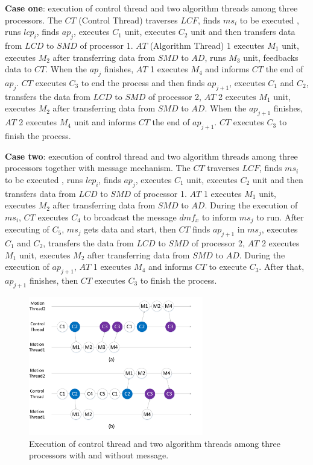 \documentclass[journal,UTF8]{IEEEtran}
\begin{document}
  \textbf{Case one}: execution of control thread and two algorithm threads among three processors. The $CT$ (Control Thread) traverses $LCF$, finds $ms_i$ to be executed , runs $lcp_i$, finds $ap_j$, executes $C_1$ unit, executes $C_2$ unit and then transfers data from $LCD$ to $SMD$ of processor 1. $AT$ (Algorithm Thread) 1 executes $M_1$ unit, executes $M_2$ after transferring data from $SMD$ to $AD$, runs $M_3$ unit, feedbacks data to $CT$. When the $ap_j$ finishes, $AT$ 1 executes $M_4$ and informs $CT$ the end of $ap_j$. $CT$ executes $C_3$ to end the process and then finds $ap_{j+1}$, executes $C_1$ and $C_2$, transfers the data from $LCD$ to $SMD$ of processor 2, $AT$ 2 executes $M_1$ unit, executes $M_2$ after transferring data from $SMD$ to $AD$. When the $ap_{j+1}$ finishes, $AT$ 2 executes $M_4$ unit and informs $CT$ the end of $ap_{j+1}$. $CT$ executes $C_3$ to finish the process.
  
  \textbf{Case two}: execution of control thread and two algorithm threads among three processors together with message mechanism. The $CT$ traverses $LCF$, finds $ms_i$ to be executed , runs $lcp_i$, finds $ap_j$, executes $C_1$ unit, executes $C_2$ unit and then transfers data from $LCD$ to $SMD$ of processor 1. $AT$ 1 executes $M_1$ unit, executes $M_2$ after transferring data from $SMD$ to $AD$. During the execution of $ms_i$, $CT$ executes $C_4$ to broadcast the message $dmf_x$ to inform $ms_{j}$ to run. After executing of $C_5$, $ms_{j}$ gets data and start, then $CT$ finds $ap_{j+1}$ in $ms_{j}$, executes $C_1$ and $C_2$, transfers the data from $LCD$ to $SMD$ of processor 2, $AT$ 2 executes $M_1$ unit, executes $M_2$ after transferring data from $SMD$ to $AD$. During the execution of $ap_{j+1}$, $AT$ 1 executes $M_4$ and informs $CT$ to execute $C_3$. After that, $ap_{j+1}$ finishes, then $CT$ executes $C_3$ to finish the process.
  

  
  \begin{figure}
  	\centering
  	\includegraphics[width=3in]{fig/threadFlow.pdf}
  	\caption{ Execution of control thread and two algorithm threads among three processors with and without message.}
  	\label{fig:threadFlow}
  \end{figure}
\end{document}
